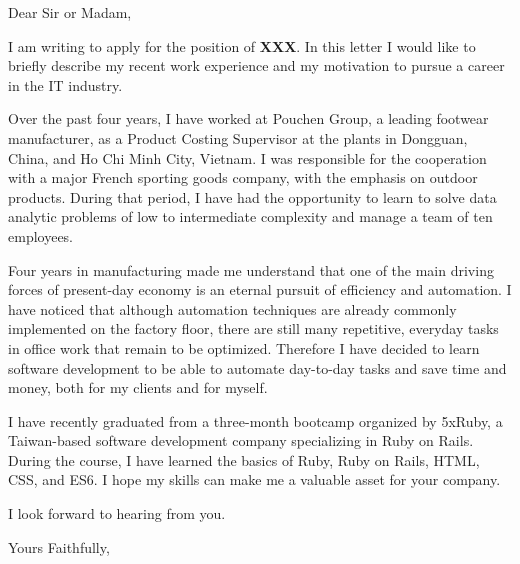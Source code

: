 \documentclass[a4paper,12pt]{letter}
\begin{document}
\begin{letter}

  \opening{Dear Sir or Madam,}

  I am writing to apply for the position of \textbf{XXX}. In this letter
  I would like to briefly describe my recent work experience and my motivation
  to pursue a career in the IT industry.
  
Over the past four years, I
have worked at Pouchen Group, a leading footwear manufacturer, as a Product
Costing Supervisor at the plants in Dongguan, China, and Ho Chi Minh City,
Vietnam. I was responsible for the cooperation with a major French sporting
goods company, with the emphasis on outdoor products. %
During that period, I have had the opportunity to learn to solve data analytic problems of low to intermediate complexity and manage a team of ten employees.

Four years in manufacturing made me understand that one of the main
driving forces of present-day economy is an eternal pursuit of efficiency and
automation. I have noticed that although automation techniques are already commonly
implemented on the factory floor, there are still many repetitive, everyday
tasks in office work that remain to be optimized. Therefore I have decided to
learn software development to be able to automate 
day-to-day tasks and save time and money, both for my clients and for myself.

I have recently graduated from a three-month bootcamp organized by 5xRuby, a Taiwan-based
software development company specializing in Ruby on Rails.
During the course, I have learned the basics of Ruby, Ruby on Rails, HTML, CSS,
and ES6.
I hope my skills can make me a valuable asset for your company.

I look forward to hearing from you.

\closing{Yours Faithfully,\\
  \\
  }

\end{letter}
\end{document}

